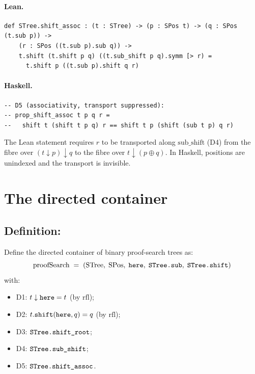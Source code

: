 \documentclass[11pt,a4paper]{article}
\begin{document}
\paragraph{Lean.}
\begin{lstlisting}[style=lean]
def STree.shift_assoc : (t : STree) -> (p : SPos t) -> (q : SPos (t.sub p)) ->
    (r : SPos ((t.sub p).sub q)) ->
    t.shift (t.shift p q) ((t.sub_shift p q).symm [> r) =
      t.shift p ((t.sub p).shift q r)
\end{lstlisting}

\paragraph{Haskell.}
\begin{lstlisting}[style=haskell]
-- D5 (associativity, transport suppressed):
-- prop_shift_assoc t p q r =
--   shift t (shift t p q) r == shift t p (shift (sub t p) q r)
\end{lstlisting}

\begin{fidelitynote}
The Lean statement requires $r$ to be transported along $\mathrm{sub\_shift}$
(D4) from the fibre over $(t \downarrow p) \downarrow q$ to the fibre over
$t \downarrow (p \oplus q)$.  In Haskell, positions are unindexed and the
transport is invisible.
\end{fidelitynote}


\section{The directed container}

\subsection{Definition: }

\begin{defn}
Define the directed container of binary proof-search trees as:
\[
  \mathrm{proofSearch} \;=\; (\mathrm{STree},\; \mathrm{SPos},\;
  \texttt{here},\; \texttt{STree.sub},\; \texttt{STree.shift})
\]
with:
\begin{itemize}
  \item D1: $t \downarrow \texttt{here} = t$ (by $\mathrm{rfl}$);
  \item D2: $t.\texttt{shift}(\texttt{here}, q) = q$ (by $\mathrm{rfl}$);
  \item D3: $\texttt{STree.shift\_root}$;
  \item D4: $\texttt{STree.sub\_shift}$;
  \item D5: $\texttt{STree.shift\_assoc}$.
\end{itemize}
\end{defn}
\end{document}
